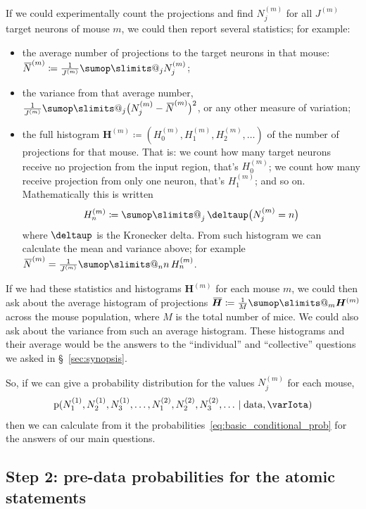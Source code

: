 \documentclass[\ifafour a4paper,12pt,\else a5paper,10pt,\fi%
onecolumn,oneside,article,%
british%
]{memoir}
\makeatletter
\theoremstyle{remark}
\theoremstyle{innote}
\def\sum{\DOTSI\sumop\slimits@}
\newcommand*{\delt}{\deltaup}%
\newcommand*{\defd}{\coloneqq}
\newcommand*{\pf}{\mathrm{p}}%
\renewcommand*{\|}[1][]{\nonscript\,#1\vert\nonscript\;\mathopen{}}
\newcommand*{\sect}{\S}%
\newcommand*{\tsum}{\mathop{\textstyle\sum}\nolimits}
\newcommand*{\widebar}[1]{{\mkern1.5mu\skew{2}\overline{\mkern-1.5mu#1\mkern-1.5mu}\mkern 1.5mu}}
\newcommand*{\yI}{\varIota}
\newcommand*{\yNa}{\widebar{N}}
\newcommand*{\yH}{\bm{H}}
\newcommand*{\yHHm}[1][m]{H^{(#1)}}
\newcommand*{\yHm}[1][m]{\yH^{(#1)}}
\newcommand*{\yJm}[1][m]{J^{(#1)}}
\newcommand*{\yNm}[1][m]{N^{(#1)}}
\newcommand*{\yNma}[1][m]{\yNa^{(#1)}}
\newcommand*{\yHa}{\widebar{\yH}}
\makeatother
\begin{document}
If we could experimentally count the projections and find $\yNm_{j}$ for all
$\yJm$ target neurons of mouse $m$,  we could then report several
statistics; for example:
\begin{itemize}[wide]
\item the average number of projections to the target neurons in that
  mouse: $\yNma \defd \frac{1}{\yJm}\sum_{j}\yNm_{j}$;
\item the variance from that average number,
  $\frac{1}{\yJm}\sum_{j}\bigl(\yNm_{j}-\yNma\bigr)^{2}$, or any other measure
  of variation;
\item the full histogram $\yHm\defd(\yHHm_{0},\yHHm_{1}, \yHHm_{2},\dotsc)$
  of the number of projections for that mouse. That is: we count how many
  target neurons receive no projection from the input region, that's
  $\yHHm_{0}$; we count how many receive projection from only one neuron, that's
  $\yHHm_{1}$; and so on. Mathematically this is written
  \begin{equation}
    \label{eq:count_histogram}
    \yHHm_{n} \defd \tsum_{j} \delt\bigl(\yNm_{j} = n\bigr)
  \end{equation}
  where $\delt$ is the Kronecker delta.
  From such histogram we can calculate the mean and variance above; for
  example $\yNma = \frac{1}{\yJm}\sum_{n}n\,\yHHm_{n}$.
\end{itemize}

If we had these statistics and histograms $\yHm$ for each mouse $m$, we
could then ask about the average histogram of projections
$\yHa \defd \frac{1}{M}\sum_{m} \yHm$ across the mouse population, where
$M$ is the total number of mice. We could also ask about the variance from
such an average histogram. These histograms and their average would be the
answers to the \enquote{individual} and \enquote{collective} questions we
asked in \sect~\ref{sec:synopsis}.

So, if we can give a probability distribution for the values $\yNm_{j}$ for
each mouse,
\begin{equation}
  \label{eq:guess_prob_N}
  \pf(\yNm[1]_{1}, \yNm[1]_{2}, \yNm[1]_{3}, \dotsc,
  \yNm[2]_{1}, \yNm[2]_{2},  \yNm[2]_{3}, \dotsc
  \| \text{data}, \yI)
\end{equation}
then we can calculate from it the
probabilities~\eqref{eq:basic_conditional_prob} for the answers of our main
questions.



\subsection{Step 2: pre-data probabilities for the atomic statements}
\label{sec:step_joint_prob}
\end{document}
